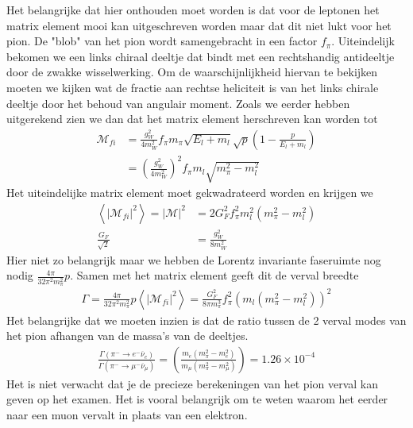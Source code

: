 \documentclass[../main.tex]{subfiles}
\begin{document}
Het belangrijke dat hier onthouden moet worden is dat voor de leptonen het matrix element mooi kan uitgeschreven worden maar dat dit niet lukt voor het pion. De "blob" van het pion wordt samengebracht in een factor $f_\pi$. Uiteindelijk bekomen we een links chiraal deeltje dat bindt met een rechtshandig antideeltje door de zwakke wisselwerking. Om de waarschijnlijkheid hiervan te bekijken moeten we kijken wat de fractie aan rechtse heliciteit is van het links chirale deeltje door het behoud van angulair moment. Zoals we eerder hebben uitgerekend zien we dan dat het matrix element herschreven kan worden tot
\begin{equation}
    \begin{aligned}
        \label{eq:pion_verval_matrix_final}
        \mathcal{M}_{fi} &= \frac{g_W^2}{4m_W^2} f_\pi m_\pi \sqrt{E_l+m_l}\sqrt{p}\left( 1 - \frac{p}{E_l+m_l} \right)\\
                         &= \left( \frac{g_W^2}{4m_W^2} \right)^2 f_\pi m_l \sqrt{m_\pi^2-m_l^2}
    \end{aligned}
\end{equation}
Het uiteindelijke matrix element moet gekwadrateerd worden en krijgen we 
\begin{equation}
    \begin{aligned}
        \label{eq:pion_verval_matrix_final_kwad}
        \left<|\mathcal{M}_{fi}|^2\right> = |\mathcal{M}|^2 &= 2G_F^2 f_\pi^2m_l^2(m_\pi^2-m_l^2)\\
        \frac{G_F}{\sqrt{2}} &= \frac{g_W^2}{8m_W^2}
    \end{aligned}
\end{equation}
Hier niet zo belangrijk maar we hebben de Lorentz invariante faseruimte nog nodig $ \frac{4\pi}{32\pi^2m_\pi^2} p$. Samen met het matrix element geeft dit de verval breedte
\begin{equation}
    \begin{aligned}
        \label{eq:pion_verval_breedte}
        \Gamma = \frac{4\pi}{32\pi^2m_\pi^2} p \left<|\mathcal{M}_{fi}|^2\right> = \frac{G_F^2}{8\pi m_\pi^3} f_\pi^2 \left( m_l(m_\pi^2-m_l^2) \right)^2
    \end{aligned}
\end{equation}
Het belangrijke dat we moeten inzien is dat de ratio tussen de 2 verval modes van het pion afhangen van de massa's van de deeltjes.
\begin{equation}
    \begin{aligned}
        \label{eq:pion_verval_ratio}
        \frac{\Gamma(\pi^- \rightarrow e^-\overline \nu_e)}{\Gamma(\pi^- \rightarrow \mu^-\overline \nu_\mu)}  = \left( \frac{m_e(m_\pi^2 - m_e^2)}{m_\mu(m_\pi^2 - m_\mu^2)} \right) = 1.26 \times 10^{-4}
    \end{aligned}
\end{equation}
{\color{red} Het is niet verwacht dat je de precieze berekeningen van het pion verval kan geven op het examen. Het is vooral belangrijk om te weten waarom het eerder naar een muon vervalt in plaats van een elektron.}
\end{document}
